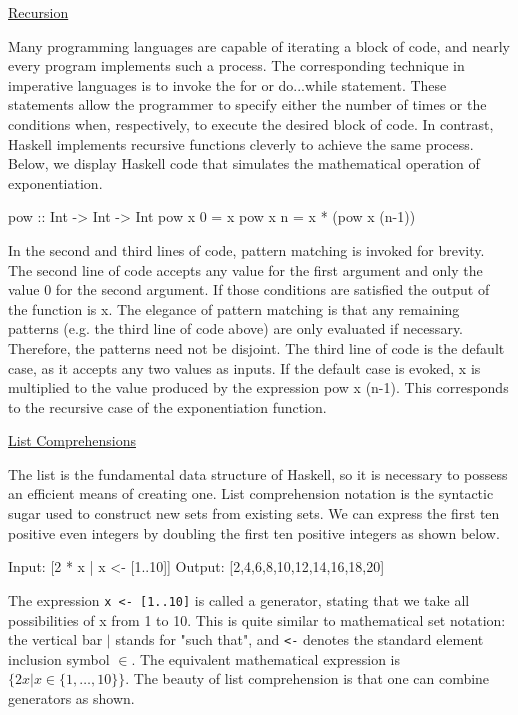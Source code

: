 \documentclass[11pt]{article}
\begin{document}
\hspace{0.5cm}\underline{Recursion}

Many programming languages are capable of iterating a block of code, and nearly every program implements such a process. The corresponding technique in imperative languages is to invoke the for or do...while statement. These statements allow the programmer to specify either the number of times or the conditions when, respectively, to execute the desired block of code. In contrast, Haskell implements recursive functions cleverly to achieve the same process. Below, we display Haskell code that simulates the mathematical operation of exponentiation. 

\hspace{2cm}\begin{verbbox}
pow :: Int -> Int -> Int                
pow x 0 = x                               
pow x n = x * (pow x (n-1))
\end{verbbox}
\theverbbox

In the second and third lines of code, pattern matching is invoked for brevity. The second line of code accepts any value for the first argument and only the value $0$ for the second argument. If those conditions are satisfied the output of the function is x. The elegance of pattern matching is that any remaining patterns (e.g. the third line of code above) are only evaluated if necessary. Therefore, the patterns need not be disjoint. The third line of code is the default case, as it accepts any two values as inputs. If the default case is evoked, x is multiplied to the value produced by the expression pow x (n-1). This corresponds to the recursive case of the exponentiation function.            

\hspace{0.5cm}\underline{List Comprehensions}

The list is the fundamental data structure of Haskell, so it is necessary to possess an efficient means of creating one. List comprehension notation is the syntactic sugar used to construct new sets from existing sets. We can express the first ten positive even integers by doubling the first ten positive integers as shown below. 

\hspace{2cm}\begin{verbbox}
Input: [2 * x | x <- [1..10]]  
Output: [2,4,6,8,10,12,14,16,18,20]
\end{verbbox}
\theverbbox

The expression \texttt{x <- [1..10]} is called a generator, stating that we take all possibilities of x from 1 to 10. This is quite similar to mathematical set notation: the vertical bar $|$ stands for "such that", and \texttt{<-} denotes the standard element inclusion symbol $\in$. The equivalent mathematical expression is $\{2x | x \in \{1,\ldots,10\}\}$. The beauty of list comprehension is that one can combine generators as shown.
\end{document}
